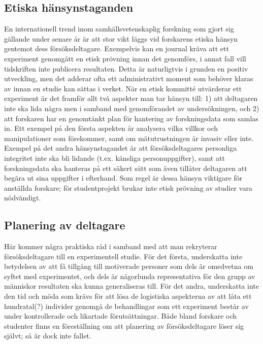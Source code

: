 \documentclass[
]{book}
\begin{document}
\hypertarget{sub07.2.4}{%
\subsection{Etiska hänsynstaganden}\label{sub07.2.4}}

En internationell trend inom samhällsvetenskaplig forskning som gjort sig gällande under senare år är att stor vikt läggs vid forskarens etiska hänsyn gentemot dess försöksdeltagare. Exempelvis kan en journal kräva att ett experiment genomgått en etisk prövning innan det genomförs, i annat fall vill tidskriften inte publicera resultaten. Detta är naturligtvis i grunden en positiv utveckling, men det adderar ofta ett administrativt moment som behöver klaras av innan en studie kan sättas i verket. När en etisk kommitté utvärderar ett experiment är det framför allt två aspekter man tar hänsyn till: 1) att deltagaren inte ska lida några men i samband med genomförandet av undersökningen, och 2) att forskaren har en genomtänkt plan för hantering av forskningsdata som samlas in. Ett exempel på den första aspekten är analysera vilka villkor och manipulationer som förekommer, samt om mätutrustningen är invasiv eller inte. Exempel på det andra hänsynstagandet är att försöksdeltagares personliga integritet inte ska bli lidande (t.ex. känsliga personuppgifter), samt att forskningsdata ska hanteras på ett säkert sätt som även tillåter deltagaren att begära ut sina uppgifter i efterhand. Som regel är dessa hänsyn viktigare för anställda forskare; för studentprojekt brukar inte etisk prövning av studier vara nödvändigt.

\hypertarget{sub07.2.5}{%
\subsection{Planering av deltagare}\label{sub07.2.5}}

Här kommer några praktiska råd i samband med att man rekryterar försöksdeltagare till en experimentell studie. För det första, underskatta inte betydelsen av att få tillgång till motiverade personer som dels är omedvetna om syftet med experimentet, och dels är någorlunda representativa för den grupp av människor resultaten ska kunna generaliseras till. För det andra, underskatta inte den tid och möda som krävs för att lösa de logistiska aspekterna av att låta ett hundratal(?) individer genomgå de behandlingar som ett experiment består av under kontrollerade och likartade förutsättningar. Både bland forskare och studenter finns en föreställning om att planering av försöksdeltagare löser sig självt; så är dock inte fallet.
\end{document}
